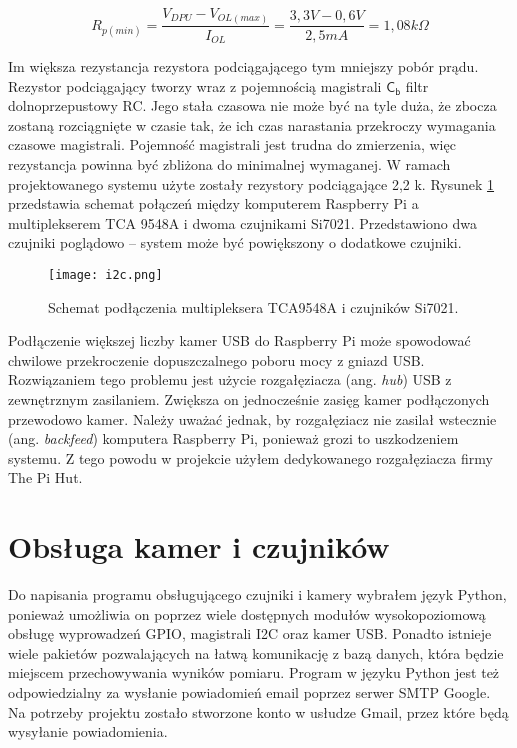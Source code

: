 \documentclass[a4paper,12pt,twoside]{article}
\begin{document}
\begin{equation} \label{pullup}
R_{p(min)} = \frac{V_{DPU} - V_{OL(max)}}{I_{OL}} = \frac{3,3 V - 0,6 V}{2,5 mA} = 1,08 k\Omega  
\end{equation} 

Im większa rezystancja rezystora podciągającego tym mniejszy pobór prądu. Rezystor podciągający tworzy wraz z pojemnością magistrali $\mathsf{C_{b}}$ filtr dolnoprzepustowy RC. Jego stała czasowa nie może być na tyle duża, że zbocza zostaną rozciągnięte w czasie tak, że ich czas narastania przekroczy wymagania czasowe magistrali. Pojemność magistrali jest trudna do zmierzenia, więc rezystancja powinna być zbliżona do minimalnej wymaganej. W ramach projektowanego systemu użyte zostały rezystory podciągające 2,2 k\textOmega. Rysunek \ref{fig: i2c_schemat} przedstawia schemat połączeń między komputerem Raspberry Pi a multiplekserem TCA 9548A i dwoma czujnikami Si7021. Przedstawiono dwa czujniki poglądowo -- system może być powiększony o dodatkowe czujniki.

\begin{figure}[h]
\texttt{[image: i2c.png]}
\caption{Schemat podłączenia multipleksera TCA9548A i czujników Si7021.}
\label{fig: i2c_schemat}
\end{figure}

Podłączenie większej liczby kamer USB do Raspberry Pi może spowodować chwilowe przekroczenie dopuszczalnego poboru mocy z gniazd USB. Rozwiązaniem tego problemu jest użycie rozgałęziacza (ang. \textit{hub}) USB z zewnętrznym zasilaniem. Zwiększa on jednocześnie zasięg kamer podłączonych przewodowo kamer. Należy uważać jednak, by rozgałęziacz nie zasilał wstecznie (ang. \textit{backfeed}) komputera Raspberry Pi, ponieważ grozi to uszkodzeniem systemu. Z tego powodu w projekcie użyłem dedykowanego rozgałęziacza firmy The Pi Hut.

\newpage
\section{Obsługa kamer i czujników}
Do napisania programu obsługującego czujniki i kamery wybrałem język Python, ponieważ umożliwia on poprzez wiele dostępnych modułów wysokopoziomową obsługę wyprowadzeń GPIO, magistrali I2C oraz kamer USB. Ponadto istnieje wiele pakietów pozwalających na łatwą komunikację z bazą danych, która będzie miejscem przechowywania wyników pomiaru. Program w języku Python jest też odpowiedzialny za wysłanie powiadomień email poprzez serwer SMTP Google. Na potrzeby projektu zostało stworzone konto w usłudze Gmail, przez które będą wysyłanie powiadomienia. 
\end{document}
